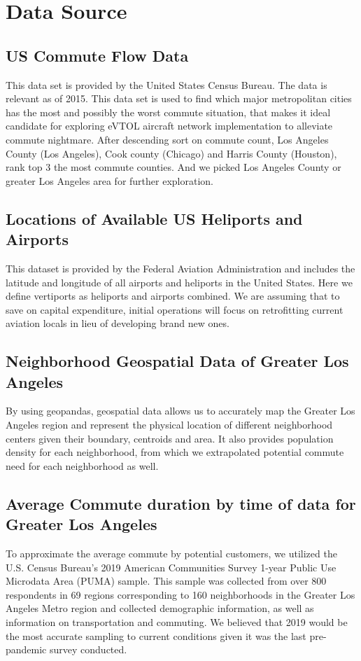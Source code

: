 \documentclass{article}
\begin{document}
\section{Data Source}

\subsection{US Commute Flow Data}
This data set is provided by the United States Census Bureau. The data is relevant as of 2015. This data set is used to find which major metropolitan cities has the most and possibly the worst commute situation, that makes it ideal candidate for exploring eVTOL aircraft network implementation to alleviate commute nightmare. After descending sort on commute count, Los Angeles County (Los Angeles), Cook county (Chicago) and Harris County (Houston), rank top 3 the most commute counties. And we picked Los Angeles County or greater Los Angeles area for further exploration.

\subsection{Locations of Available US Heliports and Airports}
This dataset is provided by the Federal Aviation Administration and includes the latitude and longitude of all airports and heliports in the United States. Here we define vertiports as heliports and airports combined. We are assuming that to save on capital expenditure, initial operations will focus on retrofitting current aviation locals in lieu of developing brand new ones.

\subsection{Neighborhood Geospatial Data of Greater Los Angeles}
By using geopandas, geospatial data allows us to accurately map the Greater Los Angeles region and represent the physical location of different neighborhood centers given their boundary, centroids and area. It also provides population density for each neighborhood, from which we extrapolated potential commute need for each neighborhood as well.

\subsection{Average Commute duration by time of data for Greater Los Angeles}
To approximate the average commute by potential customers, we utilized the U.S. Census Bureau's 2019 American Communities Survey 1-year Public Use Microdata Area (PUMA) sample. This sample was collected from over 800 respondents in 69 regions corresponding to 160 neighborhoods in the Greater Los Angeles Metro region and collected demographic information, as well as information on transportation and commuting. We believed that 2019 would be the most accurate sampling to current conditions given it was the last pre-pandemic survey conducted. 
\end{document}
